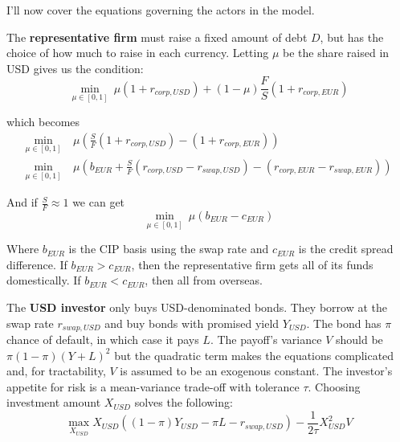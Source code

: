 I'll now cover the equations governing the actors in the model.

The \textbf{representative firm} must raise a fixed amount of debt $D$, but has the choice of how much to raise in each currency.  Letting $\mu$ be the share raised in USD gives us the condition:
\begin{equation}
  \min_{\mu \in [0,1]} \  \mu (1 + r_{corp,USD}) + (1-\mu) \frac{F}{S} (1 + r_{corp,EUR})
\end{equation}

\noindent which becomes
\begin{align*}
     \min_{\mu \in [0,1]}  & \ \mu (\frac{S}{F}(1 + r_{corp,USD}) - (1 + r_{corp,EUR})) \\
     \min_{\mu \in [0,1]}  & \ \mu (b_{EUR} + \frac{S}{F}(r_{corp, USD} - r_{swap, USD}) - (r_{corp, EUR} - r_{swap, EUR}))
\end{align*}

\noindent And if $\frac{S}{F} \approx 1$\label{SF_approx} we can get 
\begin{equation}
  \min_{\mu \in [0,1]}  \ \mu(b_{EUR} -c_{EUR})
\end{equation}

Where $b_{EUR}$ is the CIP basis using the swap rate and $c_{EUR}$ is the credit spread difference.  If $b_{EUR} > c_{EUR}$, then the representative firm gets all of its funds domestically.  If $b_{EUR} < c_{EUR}$, then all from overseas.

The \textbf{USD investor} only buys USD-denominated bonds.  They borrow at the swap rate $r_{swap, USD}$ and buy bonds with promised yield $Y_{USD}$.  The bond has $\pi$ chance of default, in which case it pays $L$.  The payoff's variance $V$ should be $\pi(1-\pi)(Y+L)^2$ but the quadratic term makes the equations complicated and, for tractability, $V$ is assumed to be an exogenous constant.  The investor's appetite for risk is a mean-variance trade-off with tolerance $\tau$.  Choosing investment amount $X_{USD}$ solves the following:
\begin{equation}
  \max_{X_{USD}} X_{USD}((1 - \pi)Y_{USD} - \pi L -r_{swap, USD}) -\frac{1}{2\tau}X_{USD}^2V
\end{equation}

